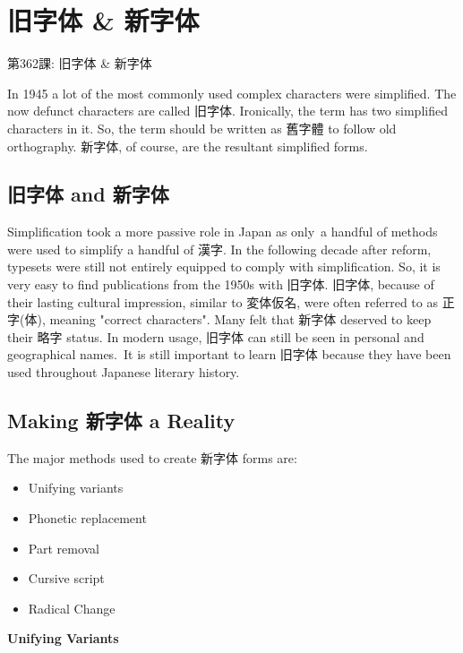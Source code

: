     
\chapter{旧字体 \& 新字体}

\begin{center}
\begin{Large}
第362課: 旧字体 \& 新字体 
\end{Large}
\end{center}
 
\par{ In 1945 a lot of the most  commonly used complex characters were simplified. The now  defunct characters are called 旧字体. Ironically, the term has two  simplified characters in it. So, the term should be written as 舊字體 to follow old orthography. 新字体, of course, are the resultant simplified forms. }
      
\section{旧字体 and 新字体}
 
\par{ Simplification took a more passive role in Japan as only a handful of methods were used to simplify a handful of 漢字. In the following decade after reform, typesets were still not entirely equipped to comply with simplification. So, it is very easy to find publications from the 1950s with 旧字体. 旧字体, because of their lasting cultural impression, similar to 変体仮名, were often referred to as 正字(体), meaning "correct characters". Many felt that 新字体 deserved to keep their 略字 status. In modern usage, 旧字体 can still be seen in personal and geographical names. It is still important to learn 旧字体 because they have been used throughout Japanese literary history. }
      
\section{Making 新字体 a Reality}
 
\par{  The major methods used to create 新字体 forms are: }

\begin{itemize}

\item Unifying variants 
\item Phonetic replacement 
\item Part removal 
\item Cursive script 
\item Radical Change 
\end{itemize}
\textbf{Unifying Variants }\hfill\break

